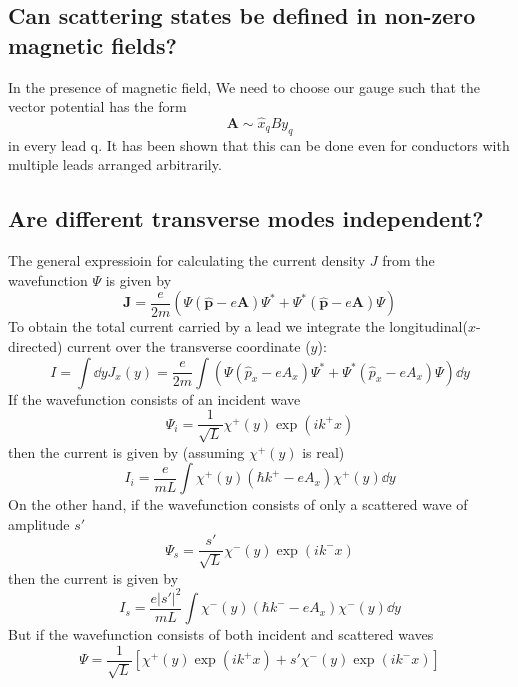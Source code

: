 \documentclass[11pt,a4paper]{book}
\theoremstyle{plain}
\theoremstyle{definition}
\theoremstyle{remark}
\renewcommand{\vec}[1]{\boldsymbol{#1}}
\begin{document}
\subsection{Can scattering states be defined in non-zero magnetic fields?}
In the presence of magnetic field, We need to choose our gauge such that the vector potential has the form
\begin{equation}
    \vec{A} \sim \hat{x}_q B y_q
\end{equation}
in every lead q. It has been shown that this can be done even for conductors with multiple leads arranged arbitrarily.
\subsection{Are different transverse modes independent?}
The general expressioin for calculating the current density $J$ from the wavefunction $\Psi$ is given by
\begin{equation}
    \vec{J} = \frac{e}{2 m}\left( \Psi (\hat{\vec{p}}-e\vec{A})\Psi^* + \Psi^*(\hat{\vec{p}}-e\vec{A}) \Psi \right)
\end{equation}
To obtain the total current carried by a lead we integrate the longitudinal($x$-directed) current over the transverse coordinate ($y$):
\begin{equation}
    I = \int \dd y J_x(y) = \frac{e}{2 m} \int \left( \Psi (\hat{p}_x - e A_x)\Psi^* + \Psi^*(\hat{p}_x - e A_x) \Psi\right) \dd y 
\end{equation}
If the wavefunction consists of an incident wave
\begin{equation}
    \Psi_i = \frac{1}{\sqrt{L}} \chi^+(y) \exp(ik^+ x)
\end{equation}
then the current is given by (assuming $\chi^+(y)$ is real)
\begin{equation}
    I_i = \frac{e}{m L} \int \chi^{+}(y) (\hbar k^+ - e A_x) \chi^+(y) \dd y
\end{equation}
On the other hand, if the wavefunction consists of only a scattered wave of amplitude $s'$
\begin{equation}
    \Psi_s = \frac{s'}{\sqrt{L}} \chi^-(y) \exp(ik^- x)
\end{equation}
then the current is given by
\begin{equation}
    I_s = \frac{e |s'|^2}{m L} \int \chi^{-}(y) (\hbar k^- - e A_x) \chi^-(y) \dd y
\end{equation}
But if the wavefunction consists of both incident and scattered waves
\begin{equation}
    \Psi = \frac{1}{\sqrt{L}} \left[ \chi^+(y) \exp(ik^+ x) + s' \chi^-(y) \exp(ik^- x) \right]
\end{equation}
\end{document}
